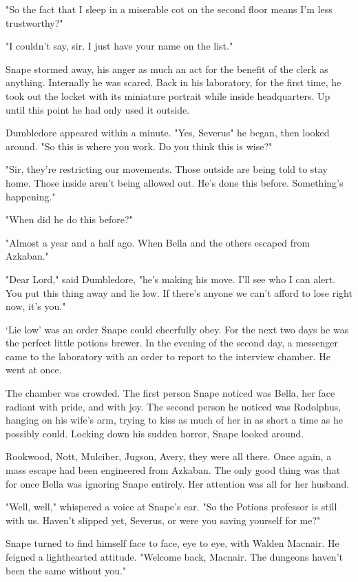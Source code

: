 "So the fact that I sleep in a miserable cot on the second floor means I'm less trustworthy?"

"I couldn't say, sir. I just have your name on the list."

Snape stormed away, his anger as much an act for the benefit of the clerk as anything. Internally he was scared. Back in his laboratory, for the first time, he took out the locket with its miniature portrait while inside headquarters. Up until this point he had only used it outside.

Dumbledore appeared within a minute. "Yes, Severus{\el}" he began, then looked around. "So this is where you work. Do you think this is wise?"

"Sir, they're restricting our movements. Those outside are being told to stay home. Those inside aren't being allowed out. He's done this before. Something's happening."

"When did he do this before?"

"Almost a year and a half ago. When Bella and the others escaped from Azkaban."

"Dear Lord," said Dumbledore, "he's making his move. I'll see who I can alert. You put this thing away and lie low. If there's anyone we can't afford to lose right now, it's you."

`Lie low' was an order Snape could cheerfully obey. For the next two days he was the perfect little potions brewer. In the evening of the second day, a messenger came to the laboratory with an order to report to the interview chamber. He went at once.

The chamber was crowded. The first person Snape noticed was Bella, her face radiant with pride, and with joy. The second person he noticed was Rodolphus, hanging on his wife's arm, trying to kiss as much of her in as short a time as he possibly could. Locking down his sudden horror, Snape looked around.

Rookwood, Nott, Mulciber, Jugson, Avery, they were all there. Once again, a mass escape had been engineered from Azkaban. The only good thing was that for once Bella was ignoring Snape entirely. Her attention was all for her husband.

"Well, well," whispered a voice at Snape's ear. "So the Potions professor is still with us. Haven't slipped yet, Severus, or were you saving yourself for me?"

Snape turned to find himself face to face, eye to eye, with Walden Macnair. He feigned a lighthearted attitude. "Welcome back, Macnair. The dungeons haven't been the same without you."

